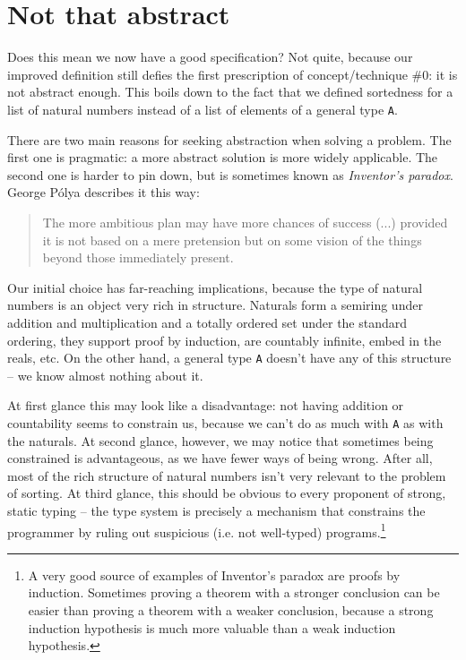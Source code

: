 \documentclass[declaration,mgr,english,shortabstract]{iithesis}
\newcommand{\m}[1]{\texttt{#1}}
\begin{document}
\section{Not that abstract} \label{notabstract}

Does this mean we now have a good specification? Not quite, because our improved definition still defies the first prescription of concept/technique \#0: it is not abstract enough. This boils down to the fact that we defined sortedness for a list of natural numbers instead of a list of elements of a general type \m{A}.

There are two main reasons for seeking abstraction when solving a problem. The first one is pragmatic: a more abstract solution is more widely applicable. The second one is harder to pin down, but is sometimes known as \textit{Inventor's paradox}. George Pólya describes it this way:

\begin{quote}
    The more ambitious plan may have more chances of success (...) provided it is not based on a mere pretension but on some vision of the things beyond those immediately present.\cite{Polya}
\end{quote}

Our initial choice has far-reaching implications, because the type of natural numbers is an object very rich in structure. Naturals form a semiring under addition and multiplication and a totally ordered set under the standard ordering, they support proof by induction, are countably infinite, embed in the reals, etc. On the other hand, a general type \m{A} doesn't have any of this structure -- we know almost nothing about it.

At first glance this may look like a disadvantage: not having addition or countability seems to constrain us, because we can't do as much with \m{A} as with the naturals. At second glance, however, we may notice that sometimes being constrained is advantageous, as we have fewer ways of being wrong. After all, most of the rich structure of natural numbers isn't very relevant to the problem of sorting. At third glance, this should be obvious to every proponent of strong, static typing -- the type system is precisely a mechanism that constrains the programmer by ruling out suspicious (i.e. not well-typed) programs.\footnote{A very good source of examples of Inventor's paradox are proofs by induction. Sometimes proving a theorem with a stronger conclusion can be easier than proving a theorem with a weaker conclusion, because a strong induction hypothesis is much more valuable than a weak induction hypothesis.}
\end{document}
